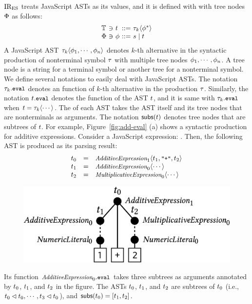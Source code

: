 $\text{IR}_\text{ES}$ treats JavaScript ASTs as its values, and it is defined with with tree
nodes $\Phi$ as follows:
\[
  \begin{array}{l@{~}c@{~}l@{~}c@{~}l}
    \treeset &\ni& \tree &::=& \ty_k \langle \node^* \rangle\\
    \nodeset &\ni& \node &::=& \str \mid \tree\\
  \end{array}
\]
A JavaScript AST $\tau_k \langle \phi_1, \cdots, \phi_n \rangle$ denotes $k$-th
alternative in the syntactic production of nonterminal symbol $\tau$ with
multiple tree nodes $\phi_1, \cdots, \phi_n$.  A tree node is a string for a
terminal symbol or another tree for a nonterminal symbol. We define several
notations to easily deal with JavaScript ASTs.  The notation $\tau_k.{\small \texttt{eval}}$
denotes an  function of $k$-th alternative in the production
$\tau$.  Similarly, the notation $t.{\small \texttt{eval}}$ denotes the 
function of the AST $t$, and it is same with $\tau_k.{\small \texttt{eval}}$ when $t =
\tau_k \langle \cdots \rangle$. The  of each AST takes the AST
itself and its tree nodes that are nonterminals as arguments.  The notation
$\textsf{subs}(t)$ denotes tree nodes that are subtrees of $t$.  For example,
Figure~\ref{fig:add-eval} (a) shows a syntactic production for additive
expressions.  Consider a JavaScript expression: .  Then, the
following AST is produced as its parsing result:
\[
  \begin{array}{lcl}
    t_0 &=&
    \textit{\small AdditiveExpression}_1 \langle t_1, {\small \texttt{"+"}}, t_2 \rangle\\

    t_1 &=&
    \textit{\small AdditiveExpression}_0 \langle \cdots \rangle\\

    t_2 &=&
    \textit{\small MultiplicativeExpression}_0 \langle \cdots \rangle\\
  \end{array}
\]
\begin{figure}[H]
  \vspace*{-1em}
  \includegraphics[width=.8\columnwidth]{img/add-ast.png}
  \vspace*{-1em}
\end{figure}
\noindent Its  function $\textit{\small AdditiveExpression}_0.{\small \texttt{eval}}$
takes three subtrees as arguments annotated by $t_0$, $t_1$, and
$t_2$ in the figure. The ASTs $t_0$, $t_1$, and $t_2$
are subtrees of $t_0$ (i.e., $t_0 \lhd t_0, \cdots, t_3
\lhd t_0$), and $\textsf{subs}(t_0) = [t_1, t_2]$.

